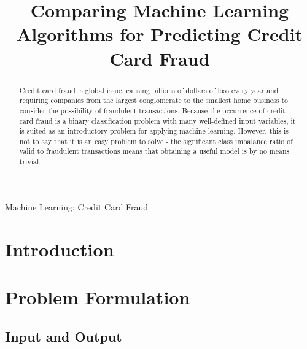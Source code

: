 \documentclass[10pt,conference]{IEEEtran}
\begin{document}
\title{Comparing Machine Learning Algorithms for Predicting Credit Card Fraud\\}

\author{
}

\maketitle

\begin{abstract}
 Credit card fraud is global issue, causing billions of dollars of loss every year\cite{Pozzolo:2015} and requiring companies from the largest conglomerate to the smallest home business to consider the possibility of fraudulent transactions. Because the occurrence of credit card fraud is a binary classification problem with many well-defined input variables, it is suited as an introductory problem for applying machine learning. However, this is not to say that it is an easy problem to solve - the significant class imbalance ratio of valid to fraudulent transactions means that obtaining a useful model is by no means trivial.
\end{abstract}

\begin{IEEEkeywords}
  Machine Learning; Credit Card Fraud
\end{IEEEkeywords}


\section{Introduction}
 


\section{Problem Formulation}
  \subsection{Input and Output}
\end{document}

